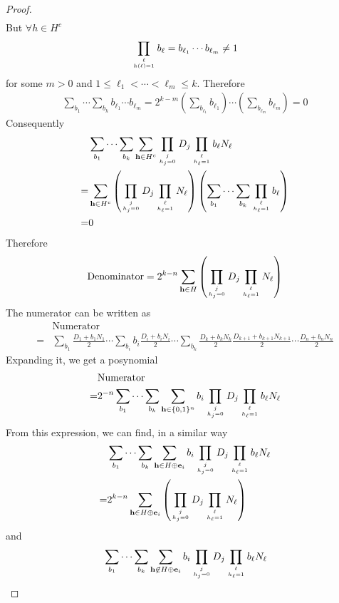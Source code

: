 \documentclass[conference]{IEEEtran}
\newcommand{\vect}[1]{\mathbf{#1}}
\begin{document}
\begin{proof}
\begin{align}
\end{align}
But $\forall h \in H^c$
\begin{align}
\prod_{\ell\atop h(\ell) = 1}b_\ell =b_{\ell_1}\cdots b_{\ell_m}\neq 1
\end{align}
for some $m>0$ and $1\le \ell_1 < \cdots < \ell_m\le k$. Therefore
\begin{align}
\sum_{b_1}\cdots\sum_{b_k}b_{\ell_1}\cdots b_{\ell_m} = 2^{k-m}\left(\sum_{b_{\ell_1}}b_{\ell_1}\right)\cdots\left(\sum_{b_{\ell_m}}b_{\ell_m}\right)=0
\end{align}
Consequently
\begin{align}
&\sum_{b_1}\cdots\sum_{b_k}\sum_{\vect{h}\in H^c}\prod_{j\atop h_j = 0}D_j\prod_{\ell\atop h_\ell = 1}b_\ell N_\ell\\
=&\sum_{\vect{h}\in H^c}\left(\prod_{j\atop h_j = 0}D_j\prod_{\ell\atop h_\ell = 1} N_\ell\right)\left(\sum_{b_1}\cdots\sum_{b_k}\prod_{\ell\atop h_\ell=1}b_\ell\right)\\
=&0
\end{align}
Therefore
\begin{align}
\text{Denominator}=2^{k-n}\sum_{\vect{h}\in H}\left(\prod_{j\atop h_j = 0}D_j\prod_{\ell\atop h_\ell = 1} N_\ell\right)
\end{align}
The numerator can be written as
\begin{align}
&\text{Numerator}\\
=&\sum_{b_1}\frac{D_1+b_1N_1}{2}\cdots\sum_{b_i}b_i\frac{D_i+b_iN_i}{2}\cdots\sum_{b_k}\frac{D_k+b_kN_k}{2}\frac{D_{k+1}+b_{k+1}N_{k+1}}{2}\cdots\frac{D_n+b_nN_n}{2}
\end{align}
Expanding it, we get a posynomial
\begin{align}
&\text{Numerator}\\
=&2^{-n}\sum_{b_1}\cdots\sum_{b_k}\sum_{\vect{h}\in \{0,1\}^n}b_i\prod_{j\atop h_j = 0}D_j\prod_{\ell\atop h_\ell = 1}b_\ell N_\ell
\end{align}
From this expression, we can find, in a similar way
\begin{align}
&\sum_{b_1}\cdots\sum_{b_k}\sum_{\vect{h}\in H\oplus \vect{e}_i}b_i\prod_{j\atop h_j = 0}D_j\prod_{\ell\atop h_\ell = 1}b_\ell N_\ell\\
=&2^{k-n}\sum_{\vect{h}\in H\oplus \vect{e}_i}\left(\prod_{j\atop h_j = 0}D_j\prod_{\ell\atop h_\ell = 1} N_\ell\right)
\end{align}
and
\begin{align}
&\sum_{b_1}\cdots\sum_{b_k}\sum_{\vect{h}\not\in H\oplus\vect{e}_i}b_i\prod_{j\atop h_j = 0}D_j\prod_{\ell\atop h_\ell = 1}b_\ell N_\ell\\

\end{align}
\end{proof}
\end{document}
